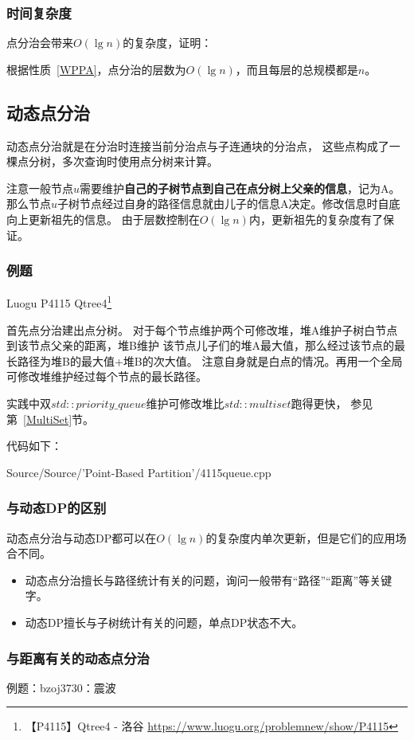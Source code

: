 \subsubsection{时间复杂度}
点分治会带来$O(\lg n)$的复杂度，证明：

根据性质~\ref{WPPA}，点分治的层数为$O(\lg n)$，而且每层的总规模都是$n$。

\subsection{动态点分治}
动态点分治就是在分治时连接当前分治点与子连通块的分治点，
这些点构成了一棵点分树，多次查询时使用点分树来计算。

注意一般节点$u$需要维护{\bfseries 自己的子树节点到自己在点分树上父亲的信息}，记为A。
那么节点$u$子树节点经过自身的路径信息就由儿子的信息A决定。修改信息时自底向上更新祖先的信息。
由于层数控制在$O(\lg n)$内，更新祖先的复杂度有了保证。

\subsubsection{例题}

Luogu P4115 Qtree4\footnote{【P4115】Qtree4 - 洛谷
\url{https://www.luogu.org/problemnew/show/P4115}}

首先点分治建出点分树。
对于每个节点维护两个可修改堆，堆A维护子树白节点到该节点父亲的距离，堆B维护
该节点儿子们的堆A最大值，那么经过该节点的最长路径为堆B的最大值+堆B的次大值。
注意自身就是白点的情况。再用一个全局可修改堆维护经过每个节点的最长路径。

实践中双$std::priority\_queue$维护可修改堆比$std::multiset$跑得更快，
参见第~\ref{MultiSet}节。

代码如下：

{Source/Source/'Point-Based Partition'/4115queue.cpp}
\subsubsection{与动态DP的区别}
动态点分治与动态DP都可以在$O(\lg n)$的复杂度内单次更新，但是它们的应用场合不同。

\begin{itemize}
    \item 动态点分治擅长与路径统计有关的问题，询问一般带有``路径''``距离''等关键字。
    \item 动态DP擅长与子树统计有关的问题，单点DP状态不大。
\end{itemize}

\subsubsection{与距离有关的动态点分治}
例题：bzoj3730：震波


